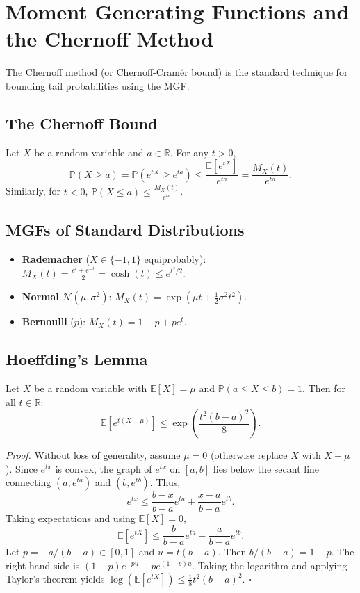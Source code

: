 \documentclass[11pt]{article}
\begin{document}
\hrulefill

\section{Moment Generating Functions and the Chernoff Method}

The Chernoff method (or Chernoff-Cramér bound) is the standard technique for bounding tail probabilities using the MGF.

\subsection{The Chernoff Bound}
Let \(X\) be a random variable and \(a \in \mathbb{R}\). For any \(t > 0\),
\[
 \mathbb{P}(X \ge a) = \mathbb{P}(e^{tX} \ge e^{ta}) \le \frac{\mathbb{E}[e^{tX}]}{e^{ta}} = \frac{M_X(t)}{e^{ta}}. 
\]
Similarly, for \(t < 0\), \(\mathbb{P}(X \le a) \le \frac{M_X(t)}{e^{ta}}\).

\subsection{MGFs of Standard Distributions}
\begin{itemize}
    \item \textbf{Rademacher} (\(X \in \{-1, 1\}\) equiprobably): \(M_X(t) = \frac{e^t + e^{-t}}{2} = \cosh(t) \le e^{t^2/2}\).
    \item \textbf{Normal} \(\mathcal{N}(\mu, \sigma^2)\): \(M_X(t) = \exp\left(\mu t + \frac{1}{2}\sigma^2 t^2\right)\).
    \item \textbf{Bernoulli} (\(p\)): \(M_X(t) = 1 - p + p e^t\).
\end{itemize}

\subsection{Hoeffding's Lemma}
Let \(X\) be a random variable with \(\mathbb{E}[X] = \mu\) and \(\mathbb{P}(a \le X \le b) = 1\). Then for all \(t \in \mathbb{R}\):
\[
 \mathbb{E}[e^{t(X - \mu)}] \le \exp\left( \frac{t^2 (b-a)^2}{8} \right). 
\]

\emph{Proof.} Without loss of generality, assume \(\mu = 0\) (otherwise replace \(X\) with \(X-\mu\)). Since \(e^{tx}\) is convex, the graph of \(e^{tx}\) on \([a,b]\) lies below the secant line connecting \((a, e^{ta})\) and \((b, e^{tb})\). Thus,
\[
 e^{tx} \le \frac{b-x}{b-a}e^{ta} + \frac{x-a}{b-a}e^{tb}. 
\]
Taking expectations and using \(\mathbb{E}[X]=0\),
\[
 \mathbb{E}[e^{tX}] \le \frac{b}{b-a}e^{ta} - \frac{a}{b-a}e^{tb}. 
\]
Let \(p = -a/(b-a) \in [0,1]\) and \(u = t(b-a)\). Then \(b/(b-a) = 1-p\). The right-hand side is \((1-p)e^{-pu} + p e^{(1-p)u}\). Taking the logarithm and applying Taylor's theorem yields \(\log(\mathbb{E}[e^{tX}]) \le \frac{1}{8}t^2(b-a)^2\). \(\square\)
\end{document}
